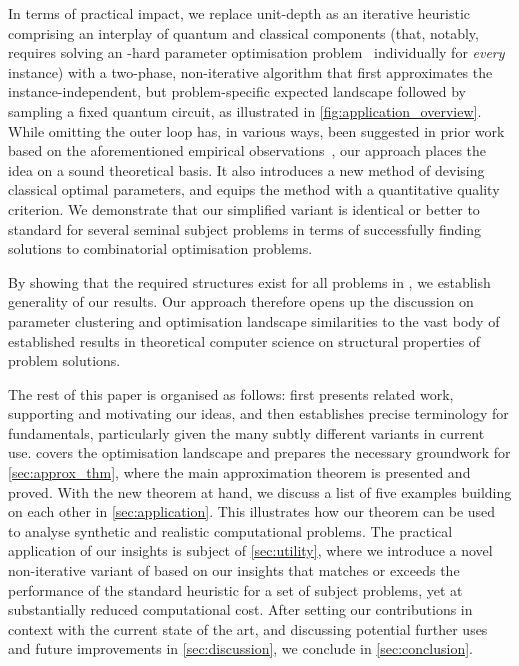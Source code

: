 In terms of practical impact, we replace unit-depth \QAOA as an 
iterative heuristic comprising an interplay of quantum and classical 
components (that, notably, requires solving an \NP-hard parameter 
optimisation problem~\cite{bittel_training_2021} individually for 
\emph{every} instance) with a two-phase, non-iterative algorithm that first approximates 
the instance-independent, but problem-specific expected landscape 
followed by sampling a fixed quantum circuit, as 
illustrated in \cref{fig:application_overview}. While omitting
the outer loop has, in various ways, been suggested in prior work based on the 
aforementioned empirical observations~\cite{brandao2018fixed,streif2020training},
our approach places the idea on a sound theoretical basis.
It also introduces a new method of devising classical optimal parameters,
and equips the method with a quantitative quality criterion. We demonstrate that our
simplified variant is identical or better to standard \QAOA for several 
seminal subject problems in terms of successfully finding solutions
to combinatorial optimisation problems.

By showing that the required structures exist for all 
problems in \NP, we establish generality of our results.
Our approach therefore opens up the discussion on parameter 
clustering and optimisation landscape similarities to the vast body 
of established results in theoretical computer science on structural 
properties of problem solutions. 

The rest of this paper is organised as follows: 
 first presents related work, supporting and 
motivating our ideas, and then establishes precise 
terminology for \QAOA fundamentals, particularly given the many subtly 
different variants in current use.  covers 
the \QAOA optimisation landscape and prepares the necessary groundwork 
for \cref{sec:approx_thm}, where the main approximation theorem is 
presented and proved. With the new theorem at hand, we discuss a list 
of five examples building on each other in \cref{sec:application}. This 
illustrates how our theorem can be used to analyse synthetic and realistic 
computational problems. The practical application of our insights is
subject of \cref{sec:utility}, where we introduce a novel non-iterative variant of \QAOA based on our insights that matches or exceeds the performance of the standard 
heuristic for a set of subject problems, yet at substantially reduced computational cost. After setting our contributions
in context with the current state of the art, and discussing potential 
further uses and future improvements in \cref{sec:discussion}, we
conclude in \cref{sec:conclusion}.


